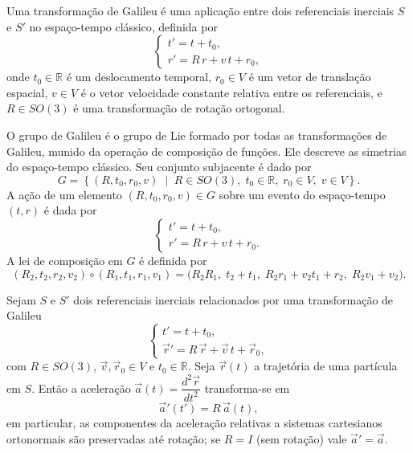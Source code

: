 \documentclass[../../main]{subfiles}
\begin{document}
\begin{defn}
    \label{def:fisica:formalismo-newtoniano:referenciais:transformacao-galileu}

    Uma transformação de Galileu é uma aplicação entre dois referenciais
    inerciais $S$ e $S'$ no espaço-tempo clássico, definida por
    \[
        \begin{cases}
            t' = t + t_0, \\
            r' = R\,r + v\, t + r_0,
        \end{cases}
    \]
    onde $t_0 \in \mathbb{R}$ é um deslocamento temporal, $r_0 \in V$ é um
    vetor de translação espacial, $v \in V$ é o vetor velocidade constante
    relativa entre os referenciais, e $R \in SO(3)$ é uma transformação de
    rotação ortogonal.
\end{defn}

\begin{defn}
    \label{def:fisica:formalismo-newtoniano:referenciais:grupo-galileu}

    O grupo de Galileu é o grupo de Lie formado por todas as transformações de
    Galileu, munido da operação de composição de funções. Ele descreve as
    simetrias do espaço-tempo clássico. Seu conjunto subjacente é dado por
    \[
        G = \left\{(R,t_0,r_0,v) \;\middle|\; R \in SO(3),\; t_0 \in
        \mathbb{R},\; r_0 \in V,\; v \in V \right\}.
    \]
    A ação de um elemento $(R,t_0,r_0,v) \in G$ sobre um evento do espaço-tempo
    $(t,r)$ é dada por
    \[
        \begin{cases}
            t' = t + t_0, \\
            r' = R\,r + v\,t + r_0.
        \end{cases}
    \]
    A lei de composição em $G$ é definida por
    \[
        (R_2,t_2,r_2,v_2) \circ (R_1,t_1,r_1,v_1)
        =
        \bigl(
            R_2 R_1,\;
            t_2 + t_1,\;
            R_2 r_1 + v_2 t_1 + r_2,\;
            R_2 v_1 + v_2
        \bigr).
    \]
\end{defn}

\begin{prop}
    \label{prop:fisica:formalismo-newtoniano:referenciais:invariancia-aceleracao-transformacoes-galileu}

    Sejam \(S\) e \(S'\) dois referenciais inerciais relacionados por uma
    transformação de Galileu
    \[
        \begin{cases}
            t' = t + t_0,\\[4pt]
            \vec r' = R\,\vec r + \vec v\,t + \vec r_0,
        \end{cases}
    \]
    com \(R\in SO(3)\), \(\vec v,\vec r_0\in V\) e \(t_0\in\mathbb{R}\). Seja
    \(\vec r(t)\) a trajetória de uma partícula em \(S\). Então a aceleração
    \(\vec a(t)=\dfrac{d^2\vec r}{dt^2}\) transforma-se em
    \[
        \vec a'(t') = R\,\vec a(t),
    \]
    em particular, as componentes da aceleração relativas a sistemas
    cartesianos ortonormais são preservadas até rotação; se \(R=I\) (sem
    rotação) vale \(\vec a'=\vec a\).
\end{prop}
\end{document}
